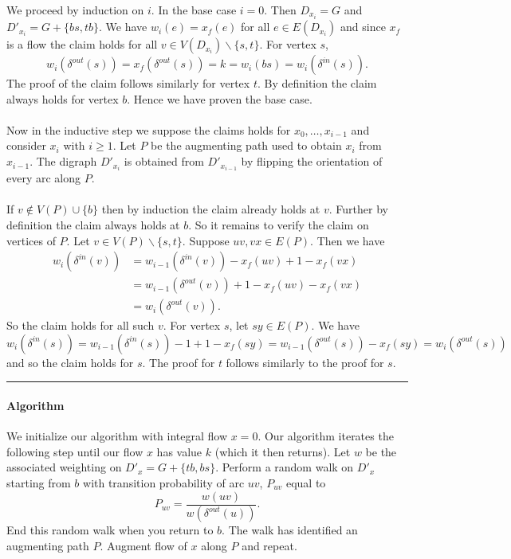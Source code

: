 \documentclass[letterpaper,12pt,oneside,onecolumn]{article}
\newenvironment{proof}{{\bf Proof:  }}{\hfill\rule{2mm}{2mm}}
\begin{document}
	\begin{proof}
		We proceed by induction on $i$. In the base case $i = 0$. Then $D_{x_i} = G$ and $D'_{x_i} = G + \{bs, tb\}$. We have $w_i(e) = x_f(e)$ for all $e \in E(D_{x_i})$ and since $x_f$ is a flow the claim holds for all $v \in V(D_{x_i})\backslash\{s,t\}$. For vertex $s$,
		$$w_i(\delta^{out}(s)) = x_f(\delta^{out}(s)) = k = w_i(bs) = w_i(\delta^{in}(s)).$$
		The proof of the claim follows similarly for vertex $t$. By definition the claim always holds for vertex $b$. Hence we have proven the base case.
		\paragraph{}
		Now in the inductive step we suppose the claims holds for $x_0, \dots, x_{i-1}$ and consider $x_i$ with $i \geq 1$. Let $P$ be the augmenting path used to obtain $x_i$ from $x_{i-1}$. The digraph $D'_{x_i}$ is obtained from $D'_{x_{i-1}}$ by flipping the orientation of every arc along $P$.
		
		\paragraph{} If $v \not\in V(P) \cup \{b\}$ then by induction the claim already holds at $v$. Further by definition the claim always holds at $b$. So it remains to verify the claim on vertices of $P$. Let $v \in V(P)\backslash\{s,t\}$. Suppose $uv, vx \in E(P)$. Then we have
		\begin{align*}
		w_i(\delta^{in}(v)) &= w_{i-1}(\delta^{in}(v)) -x_f(uv) + 1-x_f(vx)\\
		&=w_{i-1}(\delta^{out}(v)) + 1-x_f(uv) -x_f(vx) \\
		&=w_i(\delta^{out}(v)).
		\end{align*}
		So the claim holds for all such $v$. For vertex $s$, let $sy \in E(P)$. We have
		$$w_i(\delta^{in}(s)) = w_{i-1}(\delta^{in}(s)) -1 + 1-x_f(sy) = w_{i-1}(\delta^{out}(s)) -x_f(sy) = w_i(\delta^{out}(s))$$
		and so the claim holds for $s$. The proof for $t$ follows similarly to the proof for $s$.
	\end{proof}
	\paragraph{Algorithm}
	We initialize our algorithm with integral flow $x = 0$. Our algorithm iterates the following step until our flow $x$ has value $k$ (which it then returns). Let $w$ be the associated weighting on $D'_{x} = G + \{tb,bs\}$. Perform a random walk on $D'_x$ starting from $b$ with transition probability of arc $uv$, $P_{uv}$ equal to 
	$$P_{uv} = \frac{w(uv)}{w(\delta^{out}(u))}.$$
	End this random walk when you return to $b$. The walk has identified an augmenting path $P$. Augment flow of $x$ along $P$ and repeat.
\end{document}
